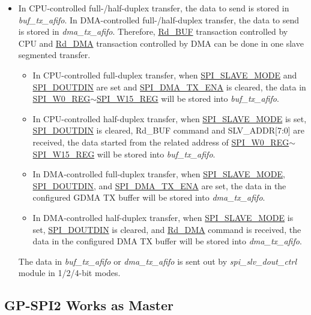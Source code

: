 \documentclass[main\_\_EN.tex]{subfiles}
\begin{document}
\begin{itemize}
\begin{itemize}
    \end{itemize}
    \item In CPU-controlled full-/half-duplex transfer, the data to send is stored in \textit{buf\_tx\_afifo}. In DMA-controlled full-/half-duplex transfer, the data to send is stored in \textit{dma\_tx\_afifo}. Therefore, \hyperref[cmd:rdbuf]{Rd\_BUF} transaction controlled by CPU and \hyperref[cmd:rddma]{Rd\_DMA} transaction controlled by DMA can be done in one slave segmented transfer.
    \begin{itemize}
        \item In CPU-controlled full-duplex transfer, when \hyperref[fielddesc:SPISLAVEMODE]{SPI\_SLAVE\_MODE} and \hyperref[fielddesc:SPIDOUTDIN]{SPI\_DOUTDIN} are set and \hyperref[fielddesc:SPIDMATXENA]{SPI\_DMA\_TX\_ENA} is cleared, the data in \hyperref[regdesc:SPIW0REG]{SPI\_W0\_REG}$\sim$\hyperref[regdesc:SPIW15REG]{SPI\_W15\_REG} will be stored into \textit{buf\_tx\_afifo}.
        \item In CPU-controlled half-duplex transfer, when \hyperref[fielddesc:SPISLAVEMODE]{SPI\_SLAVE\_MODE} is set, \hyperref[fielddesc:SPIDOUTDIN]{SPI\_DOUTDIN} is cleared, Rd\_BUF command and SLV\_ADDR[7:0] are received, the data started from the related address of \hyperref[regdesc:SPIW0REG]{SPI\_W0\_REG}$\sim$\hyperref[regdesc:SPIW15REG]{SPI\_W15\_REG} will be stored into \textit{buf\_tx\_afifo}.
        \item In DMA-controlled full-duplex transfer, when \hyperref[fielddesc:SPISLAVEMODE]{SPI\_SLAVE\_MODE}, \hyperref[fielddesc:SPIDOUTDIN]{SPI\_DOUTDIN}, and \hyperref[fielddesc:SPIDMATXENA]{SPI\_DMA\_TX\_ENA} are set, the data in the configured GDMA TX buffer will be stored into \textit{dma\_tx\_afifo}.
        \item In DMA-controlled half-duplex transfer, when \hyperref[fielddesc:SPISLAVEMODE]{SPI\_SLAVE\_MODE} is set, \hyperref[fielddesc:SPIDOUTDIN]{SPI\_DOUTDIN} is cleared, and \hyperref[cmd:rddma]{Rd\_DMA} command is received, the data in the configured DMA TX buffer will be stored into \textit{dma\_tx\_afifo}.
    \end{itemize}

The data in \textit{buf\_tx\_afifo} or \textit{dma\_tx\_afifo} is sent out by \textit{spi\_slv\_dout\_ctrl} module in 1/2/4-bit modes.
\end{itemize}

\subsection{GP-SPI2 Works as Master}\label{sec:gp-spi2-master-mode}
\end{document}
